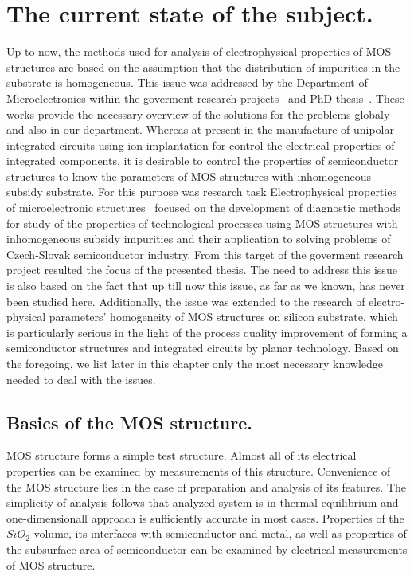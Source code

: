 \chapter{The current state of the subject.}%
\label{Chapter1}

Up to now, the methods used for analysis of electrophysical properties
of MOS structures are based on the assumption that the distribution of
impurities in the substrate is homogeneous. This issue was addressed
by the Department of Microelectronics within the goverment research
projects~\cite{1.1,1.2} and PhD thesis~\cite{1.5,1.6,1.7,1.8}. These
works provide the necessary overview of the solutions for the problems
globaly and also in our department. Whereas at present in the
manufacture of unipolar integrated circuits using ion implantation for
control the electrical properties of integrated components, it is
desirable to control the properties of semiconductor structures to
know the parameters of MOS structures with inhomogeneous subsidy
substrate. For this purpose was research task Electrophysical
properties of microelectronic structures~\cite{1.3,1.4} focused on the
development of diagnostic methods for study of the properties of
technological processes using MOS structures with inhomogeneous
subsidy impurities and their application to solving problems of
Czech-Slovak semiconductor industry. From this target of the goverment
research project resulted the focus of the presented thesis. The need
to address this issue is also based on the fact that up till now this
issue, as far as we known, has never been studied here. Additionally,
the issue was extended to the research of electro-physical parameters'
homogeneity of MOS structures on silicon substrate, which is
particularly serious in the light of the process quality improvement
of forming a semiconductor structures and integrated circuits by
planar technology. Based on the foregoing, we list later in this
chapter only the most necessary knowledge needed to deal with the
issues.

\section{Basics of the MOS structure.}

MOS structure forms a simple test structure. Almost all of its
electrical properties can be examined by measurements of this
structure. Convenience of the MOS structure lies in the ease of
preparation and analysis of its features. The simplicity of analysis
follows that analyzed system is in thermal equilibrium and
one-dimensionall approach is sufficiently accurate in most
cases. Properties of the $SiO_2$ volume, its interfaces with
semiconductor and metal, as well as properties of the subsurface area
of semiconductor can be examined by electrical measurements of MOS
structure.

